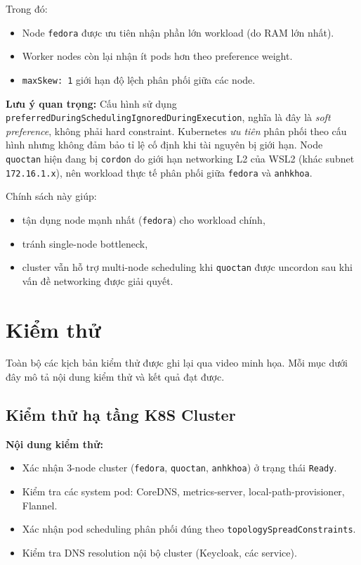 Trong đó:
\begin{itemize}
    \item Node \texttt{fedora} được ưu tiên nhận phần lớn workload (do RAM lớn nhất).
    
    \item Worker nodes còn lại nhận ít pods hơn theo preference weight.
    
    \item \texttt{maxSkew: 1} giới hạn độ lệch phân phối giữa các node.
\end{itemize}

\textbf{Lưu ý quan trọng:} Cấu hình sử dụng \texttt{preferredDuringSchedulingIgnoredDuringExecution}, nghĩa là đây là \emph{soft preference}, không phải hard constraint. Kubernetes \emph{ưu tiên} phân phối theo cấu hình nhưng không đảm bảo tỉ lệ cố định khi tài nguyên bị giới hạn. Node \texttt{quoctan} hiện đang bị \texttt{cordon} do giới hạn networking L2 của WSL2 (khác subnet \texttt{172.16.1.x}), nên workload thực tế phân phối giữa \texttt{fedora} và \texttt{anhkhoa}.

Chính sách này giúp:
\begin{itemize}
    \item tận dụng node mạnh nhất (\texttt{fedora}) cho workload chính,
    \item tránh single-node bottleneck,
    \item cluster vẫn hỗ trợ multi-node scheduling khi \texttt{quoctan} được uncordon sau khi vấn đề networking được giải quyết.
\end{itemize}

\section{Kiểm thử}

Toàn bộ các kịch bản kiểm thử được ghi lại qua video minh họa. Mỗi mục dưới đây mô tả nội dung kiểm thử và kết quả đạt được.

\subsection{Kiểm thử hạ tầng K8S Cluster}

\textbf{Nội dung kiểm thử:}
\begin{itemize}
    \item Xác nhận 3-node cluster (\texttt{fedora}, \texttt{quoctan}, \texttt{anhkhoa}) ở trạng thái \texttt{Ready}.
    \item Kiểm tra các system pod: CoreDNS, metrics-server, local-path-provisioner, Flannel.
    \item Xác nhận pod scheduling phân phối đúng theo \texttt{topologySpreadConstraints}.
    \item Kiểm tra DNS resolution nội bộ cluster (Keycloak, các service).
\end{itemize}

